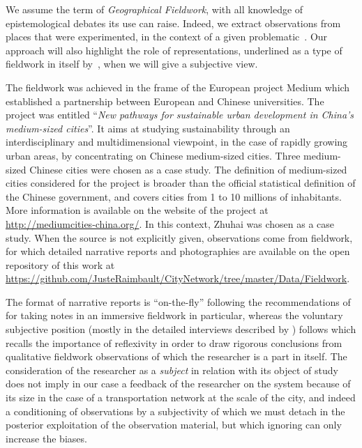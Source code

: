 \documentclass[11pt]{article}
\begin{document}
We assume the term of \emph{Geographical Fieldwork}, with all knowledge of epistemological debates its use can raise. Indeed, we extract observations from places that were experimented, in the context of a given problematic~\citep{retaille2010terrain}. Our approach will also highlight the role of representations, underlined as a type of fieldwork in itself by~\cite{lefort2012terrain}, when we will give a subjective view.

The fieldwork was achieved in the frame of the European project Medium which established a partnership between European and Chinese universities. The project was entitled ``\textit{New pathways for sustainable urban development in China’s medium-sized cities}''. It aims at studying sustainability through an interdisciplinary and multidimensional viewpoint, in the case of rapidly growing urban areas, by concentrating on Chinese medium-sized cities. Three medium-sized Chinese cities were chosen as a case study. The definition of medium-sized cities considered for the project is broader than the official statistical definition of the Chinese government, and covers cities from 1 to 10 millions of inhabitants. More information is available on the website of the project at \url{http://mediumcities-china.org/}. In this context, Zhuhai was chosen as a case study. When the source is not explicitly given, observations come from fieldwork, for which detailed narrative reports and photographies are available on the open repository of this work at \url{https://github.com/JusteRaimbault/CityNetwork/tree/master/Data/Fieldwork}.

The format of narrative reports is ``on-the-fly'' following the recommendations of \cite{goffman1989fieldwork} for taking notes in an immersive fieldwork in particular, whereas the voluntary subjective position (mostly in the detailed interviews described by \cite{raimbault2018caracterisation}) follows \cite{ball1990self} which recalls the importance of reflexivity in order to draw rigorous conclusions from qualitative fieldwork observations of which the researcher is a part in itself. The consideration of the researcher as a \emph{subject} in relation with its object of study does not imply in our case a feedback of the researcher on the system because of its size in the case of a transportation network at the scale of the city, and indeed a conditioning of observations by a subjectivity of which we must detach in the posterior exploitation of the observation material, but which ignoring can only increase the biases.
\end{document}
